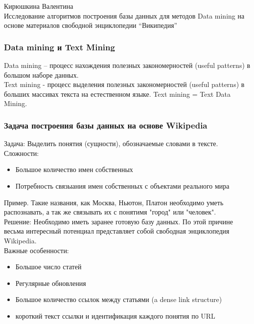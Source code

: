 \documentclass{beamer}
\begin{document}
\begin{frame}
\begin{center}
Кирюшкина Валентина \\
\vspace{1cm}
{\Large Исследование алгоритмов построения базы данных для методов Data mining на основе материалов свободной энциклопедии “Википедия”}\\ 
\end{center}
\end{frame}

\begin{frame}
\frametitle{Data mining и Text Mining}
Data mining – процесс нахождения полезных закономерностей (useful patterns)  в большом наборе данных.\\
\vspace{1cm}
Text mining - процесс выделения полезных закономерностей
(useful patterns) в больших массивах текста на естественном
языке. Text mining = Text Data Mining.
\end{frame}

\begin{frame}
\frametitle{Задача построения базы данных на основе Wikipedia}
Задача: Выделить понятия (сущности), обозначаемые словами в тексте.\\
\vspace{1cm}
Сложности:
\begin{itemize}
\item{Большое количество имен собственных}
\item{Потребность связыания имен собственных с объектами реального мира}
\end{itemize}
\vspace{1cm}
Пример. Такие названия, как Москва, Ньютон, Платон необходимо уметь распознавать,
а так же связывать их с понятимя "город" или "человек". \\
\vspace{1cm}
Решение: Необходимо иметь заранее готовую базу данных. По этой причине
весьма интересный потенциал представляет собой свободная энциклопедия
Wikipedia.\\
\vspace{1cm}
Важные особенности:
\begin{itemize}
\item{Большое число статей}
\item{Регулярные обновления}
\item{Большое количество ссылок между статьями (a dense link structure)}
\item{короткий текст ссылки и идентификация каждого понятия по URL}
\end{itemize}

\end{frame}
\end{document}

